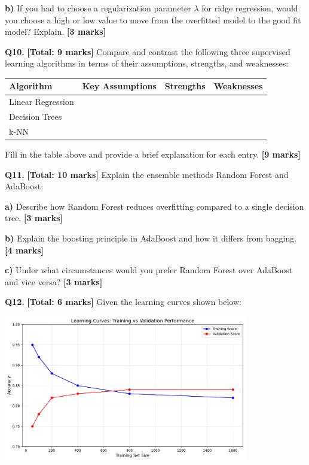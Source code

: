 \documentclass{article}
\begin{document}
\textbf{b)} If you had to choose a regularization parameter $\lambda$ for ridge regression, would you choose a high or low value to move from the overfitted model to the good fit model? Explain. \textbf{[3 marks]}


\textbf{Q10.} \textbf{[Total: 9 marks]} Compare and contrast the following three supervised learning algorithms in terms of their assumptions, strengths, and weaknesses:

\begin{center}
\begin{tabular}{|p{3cm}|p{3cm}|p{3cm}|p{3cm}|}
\hline
\textbf{Algorithm} & \textbf{Key Assumptions} & \textbf{Strengths} & \textbf{Weaknesses} \\
\hline
Linear Regression & & & \\
\hline
Decision Trees & & & \\
\hline
k-NN & & & \\
\hline
\end{tabular}
\end{center}

Fill in the table above and provide a brief explanation for each entry. \textbf{[9 marks]}


\textbf{Q11.} \textbf{[Total: 10 marks]} Explain the ensemble methods Random Forest and AdaBoost:

\textbf{a)} Describe how Random Forest reduces overfitting compared to a single decision tree. \textbf{[3 marks]}

\textbf{b)} Explain the boosting principle in AdaBoost and how it differs from bagging. \textbf{[4 marks]}

\textbf{c)} Under what circumstances would you prefer Random Forest over AdaBoost and vice versa? \textbf{[3 marks]}


\textbf{Q12.} \textbf{[Total: 6 marks]} Given the learning curves shown below:

\begin{center}
\includegraphics[width=0.8\textwidth]{figures/learning_curves.pdf}
\end{center}
\end{document}
